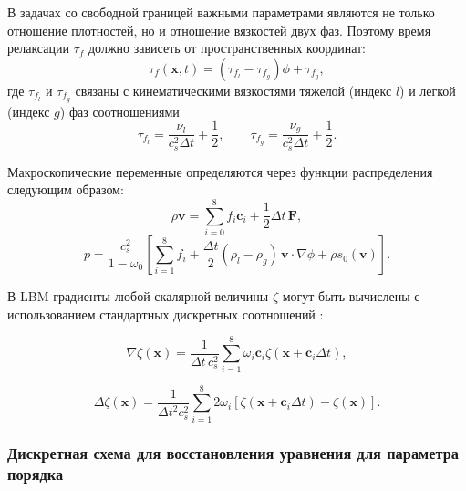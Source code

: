 \documentclass[12pt,a4paper]{article}
\begin{document}
В задачах со свободной границей важными параметрами являются не только отношение плотностей, но и отношение вязкостей двух фаз. Поэтому время релаксации $\tau_f$ должно зависеть от пространственных координат:
\begin{equation*}
	\tau_f(\mathbf{x},t) =
	(\tau_{f_l}-\tau_{f_g})\phi + \tau_{f_g},
\end{equation*}
где $\tau_{f_l}$ и $\tau_{f_g}$ связаны с кинематическими вязкостями тяжелой (индекс $l$) и легкой (индекс $g$) фаз соотношениями
\begin{equation*}
	\tau_{f_l}=
	\frac{\nu_l}{c_s^2 \Delta t}+\frac{1}{2},
	\qquad
	\tau_{f_g}=
	\frac{\nu_g}{c_s^2 \Delta t}+\frac{1}{2}.
\end{equation*}

Макроскопические переменные определяются через функции распределения следующим образом:
\begin{equation}
	\rho\mathbf{v}=\sum_{i=0}^{8} f_i \mathbf{c}_i + \frac{1}{2}\Delta t\,\mathbf{F},
\end{equation}
\begin{equation}
	p=\frac{c_s^2}{1-\omega_0}
	\left[
	\sum_{i=1}^{8} f_i
	+\frac{\Delta t}{2}(\rho_l-\rho_g)\,\mathbf{v}\cdot\nabla\phi
	+\rho s_0(\mathbf{v})
	\right].
\end{equation}


В LBM градиенты любой скалярной величины $\zeta$ могут быть вычислены с использованием стандартных дискретных соотношений \cite{Ren2016, Liu2014, Liang2018}:

$$
\nabla \zeta(\mathbf{x})=
\frac{1}{\Delta t\,c_s^2}
\sum_{i=1}^{8}
\omega_i \mathbf{c}_i
\zeta(\mathbf{x}+\mathbf{c}_i\Delta t),
$$

$$
\Delta \zeta(\mathbf{x})=
\frac{1}{\Delta t^2 c_s^2}
\sum_{i=1}^{8}
2\omega_i
\left[
\zeta(\mathbf{x}+\mathbf{c}_i\Delta t)-\zeta(\mathbf{x})
\right].
$$
	
\subsubsection{Дискретная схема для восстановления уравнения для параметра порядка}
	
\end{document}
